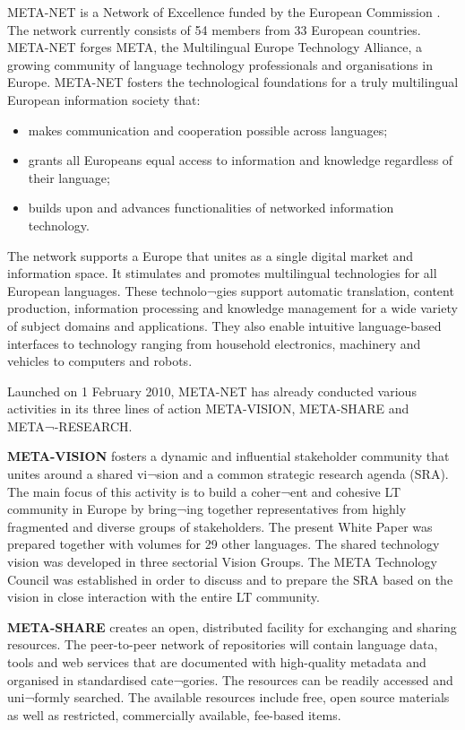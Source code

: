 \begin{multicols}{2}
META-NET is a Network of Excellence funded by the European Commission \cite{rehm2011}. The network currently consists of 54 members from 33 European countries. META-NET forges META, the Multilingual Europe Technology Alliance, a growing community of language technology professionals and organisations in Europe. META-NET fosters the technological foundations for a truly multilingual European information society that:

\begin{itemize}
\item makes communication and cooperation possible across languages;
\item grants all Europeans equal access to information and knowledge regardless of their language; 
\item builds upon and advances functionalities of networked information technology.
\end{itemize}

The network supports a Europe that unites as a single digital market and information space. It stimulates and promotes multilingual technologies for all European languages. These technolo¬gies support automatic translation, content production, information processing and knowledge management for a wide variety of subject domains and applications. They also enable intuitive language-based interfaces to technology ranging from household electronics, machinery and vehicles to computers and robots.

Launched on 1 February 2010, META-NET has already conducted various activities in its three lines of action META-VISION, META-SHARE and META¬-RESEARCH. 

\textbf{META-VISION} fosters a dynamic and inﬂuential stakeholder community that unites around a shared vi¬sion and a common strategic research agenda (SRA). The main focus of this activity is to build a coher¬ent and cohesive LT community in Europe by bring¬ing together representatives from highly fragmented and diverse groups of stakeholders. The present White Paper was prepared together with volumes for 29 other languages. The shared technology vision was developed in three sectorial Vision Groups. The META Technology Council was established in order to discuss and to prepare the SRA based on the vision in close interaction with the entire LT community. 

\textbf{META-SHARE} creates an open, distributed facility for exchanging and sharing resources. The peer-to-peer network of repositories will contain language data, tools and web services that are documented with high-quality metadata and organised in standardised cate¬gories. The resources can be readily accessed and uni¬formly searched. The available resources include free, open source materials as well as restricted, commercially available, fee-based items. 


\end{multicols}
